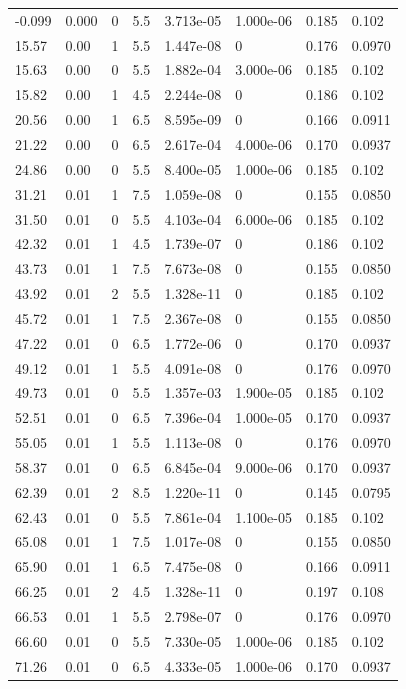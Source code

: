 \documentclass[preview]{standalone}
\begin{document}
{{\begin{tabular}{L{1.2cm}C{1.2cm} C{0.3cm}C{0.5cm} C{1.4cm}C{1.4cm} C{1.4cm}C{1.4cm}}
  -0.099  &  0.000  & 0     & 5.5 &  3.713e-05  & 1.000e-06  & 0.185 &  0.102   \\ 
  15.57  &  0.00  & 1     & 5.5 &  1.447e-08  & 0  & 0.176 &  0.0970   \\ 
  15.63  &  0.00  & 0     & 5.5 &  1.882e-04  & 3.000e-06  & 0.185 &  0.102   \\ 
  15.82  &  0.00  & 1     & 4.5 &  2.244e-08  & 0  & 0.186 &  0.102   \\ 
  20.56  &  0.00  & 1     & 6.5 &  8.595e-09  & 0  & 0.166 &  0.0911   \\ 
  21.22  &  0.00  & 0     & 6.5 &  2.617e-04  & 4.000e-06  & 0.170 &  0.0937   \\ 
  24.86  &  0.00  & 0     & 5.5 &  8.400e-05  & 1.000e-06  & 0.185 &  0.102   \\ 
  31.21  &  0.01  & 1     & 7.5 &  1.059e-08  & 0  & 0.155 &  0.0850   \\ 
  31.50  &  0.01  & 0     & 5.5 &  4.103e-04  & 6.000e-06  & 0.185 &  0.102   \\ 
  42.32  &  0.01  & 1     & 4.5 &  1.739e-07  & 0  & 0.186 &  0.102   \\ 
  43.73  &  0.01  & 1     & 7.5 &  7.673e-08  & 0  & 0.155 &  0.0850   \\ 
  43.92  &  0.01  & 2     & 5.5 &  1.328e-11  & 0  & 0.185 &  0.102   \\ 
  45.72  &  0.01  & 1     & 7.5 &  2.367e-08  & 0  & 0.155 &  0.0850   \\ 
  47.22  &  0.01  & 0     & 6.5 &  1.772e-06  & 0  & 0.170 &  0.0937   \\ 
  49.12  &  0.01  & 1     & 5.5 &  4.091e-08  & 0  & 0.176 &  0.0970   \\ 
  49.73  &  0.01  & 0     & 5.5 &  1.357e-03  & 1.900e-05  & 0.185 &  0.102   \\ 
  52.51  &  0.01  & 0     & 6.5 &  7.396e-04  & 1.000e-05  & 0.170 &  0.0937   \\ 
  55.05  &  0.01  & 1     & 5.5 &  1.113e-08  & 0  & 0.176 &  0.0970   \\ 
  58.37  &  0.01  & 0     & 6.5 &  6.845e-04  & 9.000e-06  & 0.170 &  0.0937   \\ 
  62.39  &  0.01  & 2     & 8.5 &  1.220e-11  & 0  & 0.145 &  0.0795   \\ 
  62.43  &  0.01  & 0     & 5.5 &  7.861e-04  & 1.100e-05  & 0.185 &  0.102   \\ 
  65.08  &  0.01  & 1     & 7.5 &  1.017e-08  & 0  & 0.155 &  0.0850   \\ 
  65.90  &  0.01  & 1     & 6.5 &  7.475e-08  & 0  & 0.166 &  0.0911   \\ 
  66.25  &  0.01  & 2     & 4.5 &  1.328e-11  & 0  & 0.197 &  0.108   \\ 
  66.53  &  0.01  & 1     & 5.5 &  2.798e-07  & 0  & 0.176 &  0.0970   \\ 
  66.60  &  0.01  & 0     & 5.5 &  7.330e-05  & 1.000e-06  & 0.185 &  0.102   \\ 
  71.26  &  0.01  & 0     & 6.5 &  4.333e-05  & 1.000e-06  & 0.170 &  0.0937   \\ 
\hline 
\end{tabular} 

}}
\end{document}
